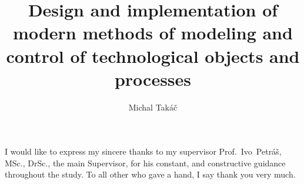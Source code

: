 \documentclass[]{tukethesis}
\author{Michal Takáč}
\title{Design and implementation of modern methods of modeling and control of technological objects and processes}
\subtitle{}
\begin{document}
\renewcommand\theHfigure{\theHsection.\arabic{figure}}
\renewcommand\theHtable{\theHsection.\arabic{table}}

\firstpage

\titlepage


%
%

\abstrakte %

\abstrakt %

\endabstract %

\assignthesis

\declaration

\acknowledgement %
I would like to express my sincere thanks to my supervisor Prof.~Ivo~Petráš, MSc., DrSc., the main Supervisor, for his constant, and constructive guidance
throughout the study. To all other who gave a hand, I say thank you
very much.
\endacknowledgement
\end{document}
